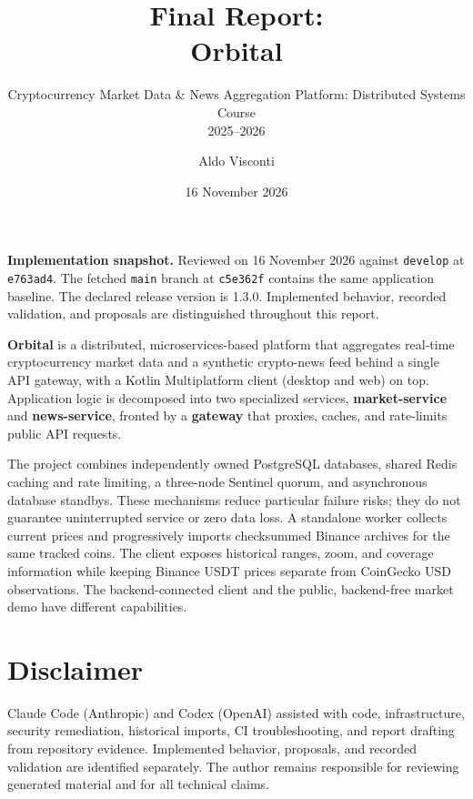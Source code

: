 \documentclass{scrartcl}
\title{\LARGE
    Final Report:\\
    Orbital
}
\subtitle{Cryptocurrency Market Data \& News Aggregation Platform: Distributed Systems Course\\
2025--2026}
\author{
    Aldo Visconti \\ \emailaddr{aldo.visconti@studio.unibo.it}
}
\date{16 November 2026}
\begin{document}
\sloppy

\maketitle

\noindent\textbf{Implementation snapshot.} Reviewed on 16 November 2026 against
\texttt{develop} at \texttt{e763ad4}. The fetched \texttt{main} branch at \texttt{c5e362f}
contains the same application baseline. The declared release version is 1.3.0. Implemented behavior,
recorded validation, and proposals are distinguished throughout this report.

\noindent
\textbf{Orbital} is a distributed, microservices-based platform that aggregates real-time
cryptocurrency market data and a synthetic crypto-news feed behind a single API gateway, with a Kotlin
Multiplatform client (desktop and web) on top. Application logic is decomposed into two
specialized services, \textbf{market-service} and \textbf{news-service}, fronted by a
\textbf{gateway} that proxies, caches, and rate-limits public API requests.

The project combines independently owned PostgreSQL databases, shared Redis caching and rate
limiting, a three-node Sentinel quorum, and asynchronous database standbys. These mechanisms
reduce particular failure risks; they do not guarantee uninterrupted service or zero data loss.
A standalone worker collects current prices and progressively imports checksummed Binance
archives for the same tracked coins. The client exposes historical ranges, zoom, and coverage
information while keeping Binance USDT prices separate from CoinGecko USD observations.
The backend-connected client and the public, backend-free market demo have different capabilities.

\section*{Disclaimer}

Claude Code (Anthropic) and Codex (OpenAI) assisted with code, infrastructure, security
remediation, historical imports, CI troubleshooting, and report drafting from repository evidence.
Implemented behavior, proposals, and recorded validation are identified separately. The author
remains responsible for reviewing generated material and for all technical claims.
\end{document}
